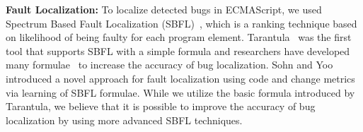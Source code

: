 \textbf{Fault Localization:} To localize detected bugs in ECMAScript, we used
Spectrum Based Fault Localization (SBFL)~\cite{sbfl-survey}, which is a ranking
technique based on likelihood of being faulty for each program element.
Tarantula~\cite{tarantula, tarantula2} was the first tool that supports SBFL
with a simple formula and researchers have developed many formulae~\cite{ample, zoltar,
sbfl-model, effect-sbfl} to increase the accuracy of bug localization.
Sohn and Yoo~\cite{fluccs} introduced a novel approach for fault
localization using code and change metrics via learning of SBFL formulae.
While we utilize the basic formula introduced by Tarantula, we
believe that it is possible to improve the accuracy of bug localization by
using more advanced SBFL techniques.

